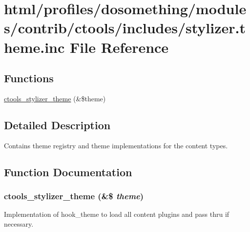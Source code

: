 \hypertarget{stylizer_8theme_8inc}{
\section{html/profiles/dosomething/modules/contrib/ctools/includes/stylizer.theme.inc File Reference}
\label{stylizer_8theme_8inc}
}
\subsection*{Functions}
\begin{DoxyCompactItemize}
\item 
\hyperlink{stylizer_8theme_8inc_a17583a4517f76cd18b959fc9fc4b7c70}{ctools\_\-stylizer\_\-theme} (\&\$theme)
\end{DoxyCompactItemize}


\subsection{Detailed Description}
Contains theme registry and theme implementations for the content types. 

\subsection{Function Documentation}
\hypertarget{stylizer_8theme_8inc_a17583a4517f76cd18b959fc9fc4b7c70}{
\subsubsection[{ctools\_\-stylizer\_\-theme}]{\setlength{\rightskip}{0pt plus 5cm}ctools\_\-stylizer\_\-theme (\&\$ {\em theme})}}
\label{stylizer_8theme_8inc_a17583a4517f76cd18b959fc9fc4b7c70}
Implementation of hook\_\-theme to load all content plugins and pass thru if necessary. 